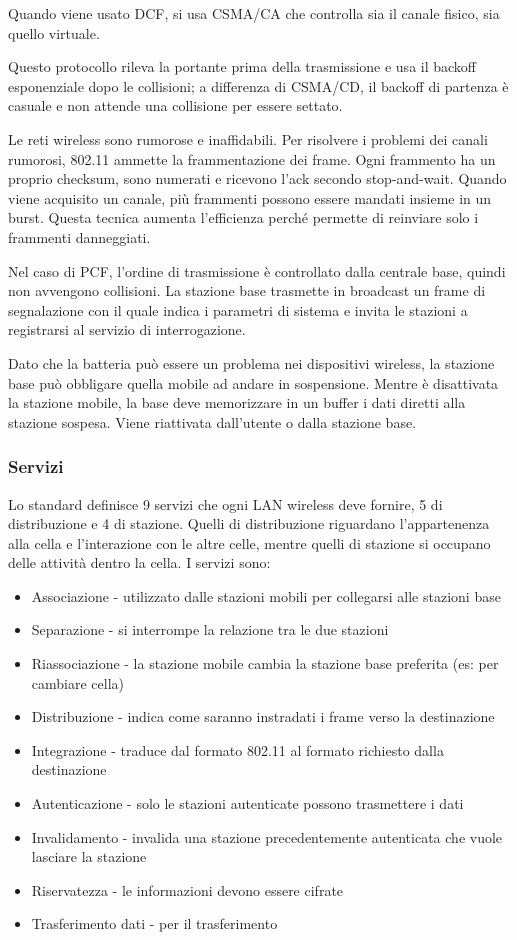 Quando viene usato DCF, si usa CSMA/CA che controlla sia il canale fisico, sia quello virtuale.

Questo protocollo rileva la portante prima della trasmissione e usa il backoff esponenziale dopo le collisioni;
a differenza di CSMA/CD, il backoff di partenza è casuale e non attende una collisione per essere settato.


Le reti wireless sono rumorose e inaffidabili.
Per risolvere i problemi dei canali rumorosi, 802.11 ammette la frammentazione dei frame.
Ogni frammento ha un proprio checksum, sono numerati e ricevono l'ack secondo stop-and-wait.
Quando viene acquisito un canale, più frammenti possono essere mandati insieme in un burst.
Questa tecnica aumenta l'efficienza perché permette di reinviare solo i frammenti danneggiati.

Nel caso di PCF, l'ordine di trasmissione è controllato dalla centrale base, quindi non avvengono collisioni.
La stazione base trasmette in broadcast un frame di segnalazione con il quale indica i parametri di sistema e invita le stazioni a registrarsi al servizio di interrogazione.

Dato che la batteria può essere un problema nei dispositivi wireless, la stazione base può obbligare quella mobile ad andare in sospensione.
Mentre è disattivata la stazione mobile, la base deve memorizzare in un buffer i dati diretti alla stazione sospesa.
Viene riattivata dall'utente o dalla stazione base.

\subsubsection{Servizi}
Lo standard definisce 9 servizi che ogni LAN wireless deve fornire, 5 di distribuzione e 4 di stazione.
Quelli di distribuzione riguardano l'appartenenza alla cella e l'interazione con le altre celle, mentre quelli di stazione si occupano delle attività dentro la cella.
I servizi sono:
\begin{itemize}
\item Associazione - utilizzato dalle stazioni mobili per collegarsi alle stazioni base
\item Separazione - si interrompe la relazione tra le due stazioni
\item Riassociazione - la stazione mobile cambia la stazione base preferita (es: per cambiare cella)
\item Distribuzione - indica come saranno instradati i frame verso la destinazione
\item Integrazione - traduce dal formato 802.11 al formato richiesto dalla destinazione
\item Autenticazione - solo le stazioni autenticate possono trasmettere i dati
\item Invalidamento - invalida una stazione precedentemente autenticata che vuole lasciare la stazione
\item Riservatezza - le informazioni devono essere cifrate
\item Trasferimento dati - per il trasferimento
\end{itemize}


